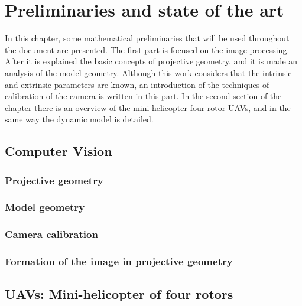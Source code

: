 
\chapter{Preliminaries and state of the art}

\ifpdf
    \graphicspath{{Chapter2/Figs/Raster/}{Chapter2/Figs/PDF/}{Chapter2/Figs/}}
\else
    \graphicspath{{Chapter2/Figs/Vector/}{Chapter2/Figs/}}
\fi

In this chapter, some mathematical preliminaries that will be used throughout the document are presented. The first part is focused on the image processing. After it is explained the basic concepts of projective geometry, and it is made an analysis of the model geometry. Although this work considers that the intrinsic and extrinsic parameters are known, an introduction of the techniques of calibration of the camera is written in this part. In the second section of the chapter there is an overview of the mini-helicopter four-rotor UAVs, and in the same way the dynamic model is detailed.

 \section{Computer Vision}
 \subsection{Projective geometry}
 \subsection{Model geometry}
 \subsection{Camera calibration}
 \subsection{Formation of the image in projective geometry}



 \section{UAVs: Mini-helicopter of four rotors}

